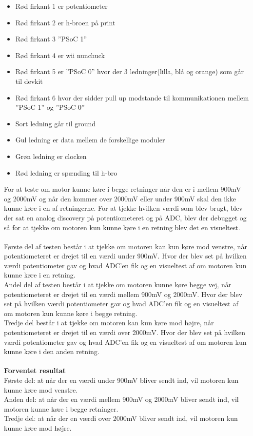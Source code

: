\begin{itemize}
	\item Rød firkant 1 er potentiometer
	\item Rød firkant 2 er h-broen på print
	\item Rød firkant 3 ”PSoC 1”
	\item Rød firkant 4 er wii nunchuck
	\item Rød firkant 5 er ”PSoC 0” hvor der 3 ledninger(lilla, blå og orange) som går til devkit 
	\item Rød firkant 6 hvor der sidder pull up modstande til kommunikationen mellem ”PSoC 1” og ”PSoC 0”
	\item Sort ledning går til ground 
	\item Gul ledning er data mellem de forskellige moduler
	\item Grøn ledning er clocken
	\item Rød ledning er spænding til h-bro
	
\end{itemize}
For at teste om motor kunne køre i begge retninger når den er i mellem 900mV og 2000mV og når den kommer over 2000mV eller under 900mV skal den ikke kunne køre i en af retningerne.
For at tjekke hvilken værdi som blev brugt, blev der sat en analog discovery på potentiometeret og på ADC, blev der debugget og så for at tjekke om motoren kun kunne køre i en retning blev det en visueltest. \\
\\
Første del af testen består i at tjekke om motoren kan kun køre mod venstre, når potentiometeret er drejet til en værdi under 900mV. Hvor der blev set på hvilken værdi potentiometer gav og hvad ADC’en fik og en visueltest af om motoren kun kunne køre i en retning.\\
Andel del af testen består i at tjekke om motoren kunne køre begge vej, når potentiometeret er drejet til en værdi mellem 900mV og 2000mV. Hvor der blev set på hvilken værdi potentiometer gav og hvad ADC’en fik og en visueltest af om motoren kun kunne køre i begge retning.\\
Tredje del består i at tjekke om motoren kan kun køre mod højre, når potentiometeret er drejet til en værdi over 2000mV. Hvor der blev set på hvilken værdi potentiometer gav og hvad ADC’en fik og en visueltest af om motoren kun kunne køre i den anden retning.\\
\\
\textbf{Forventet resultat}
\\Første del: at når der en værdi under 900mV bliver sendt ind, vil motoren kun kunne køre mod venstre.\\
Anden del: at når der en værdi mellem 900mV og 2000mV bliver sendt ind, vil motoren kunne køre i begge retninger.\\
Tredje del: at når der en værdi over 2000mV bliver sendt ind, vil motoren kun kunne køre mod højre.

